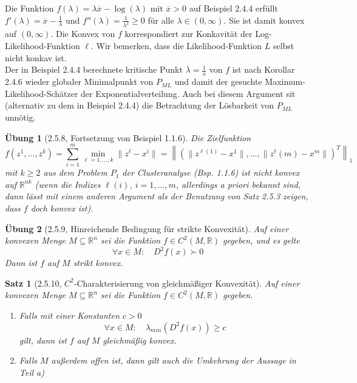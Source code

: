 \documentclass[12pt]{extreport} %
\newcommand{\R}{\mathbb{R}}
\theoremstyle{named}
\theoremstyle{nnamed}
\theoremstyle{itshape}
\newtheorem*{satz}{Satz}
\theoremstyle{normal}
\newtheorem*{uebung}{Übung}
\begin{document}
\begin{beispiel}
	Die Funktion $f(\lambda) = \lambda \overline{x} - \log(\lambda)$ mit $\overline{x} > 0$ auf Beispiel 2.4.4 erfüllt $f'(\lambda) = \overline{x} - \frac{1}{\lambda}$ und $f''(\lambda) = \frac{1}{\lambda^2} \geq 0$ für alle $\lambda \in (0, \infty)$. Sie ist damit konvex auf $(0, \infty)$. Die Konvex von $f$ korrespondiert zur Konkavität der Log-Likelihood-Funktion $\ell$. Wir bemerken, dass die Likelihood-Funktion $L$ selbst nicht konkav ist. ~\\
	
	Der in Beispiel 2.4.4 berechnete kritische Punkt $\overline{\lambda} = \frac{1}{\overline{x}}$ von $f$ ist nach Korollar 2.4.6 wieder globaler Minimalpunkt von $P_{ML}$ und damit der gesuchte Maximum-Likelihood-Schätzer der Exponentialverteilung. Auch bei diesem Argument sit (alternativ zu dem in Beispiel 2.4.4) die Betrachtung der Lösbarkeit von $P_{ML}$ unnötig.
\end{beispiel}

\begin{uebung}[2.5.8, Fortsetzung von Beispiel 1.1.6]
	Die Zielfunktion 
	$$ f(z^1, \dotsc, z^k) = \sum_{i=1}^{m} \min_{\ell=1, \dotsc, k} \| z^\ell - x^i \| = \left\| \left( \| z^{\ell(1)} - x^1 \|, \dotsc, \| z^\ell(m) - x^m \| \right)^T \right\|_1 $$	
	mit $k \geq 2$ aus dem Problem $P_1$ der Clusteranalyse (Bsp. 1.1.6) ist nicht konvex auf $\R^{nk}$ (wenn die Indizes $\ell(i)$, $i =1, \dotsc, m$, allerdings a priori bekannt sind, dann lässt mit einem anderen Argument als der Benutzung von Satz 2.5.3 zeigen, dass $f$ doch konvex ist).
\end{uebung}

\begin{uebung}[2.5.9, Hinreichende Bedingung für strikte Konvexität]
	Auf einer konvexen Menge $M \subseteq \R^n$ sei die Funktion $f \in C^2(M, \R)$ gegeben, und es gelte
	$$ \forall x\in M: \quad D^2 f(x) \succ 0 $$
	Dann ist $f$ auf $M$ strikt konvex.	
\end{uebung}

\begin{satz}[2.5.10, $C^2$-Charakterisierung von gleichmäßiger Konvexität]
	Auf einer konvexen Menge $M \subseteq \R^n$ sei die Funktion $f \in C^2(M, \R)$ gegeben.
	\begin{enumerate}
		\item Falls mit einer Konstanten $c > 0$
		$$ \forall x \in M: \quad \lambda_{min} \left( D^2 f(x) \right) \geq c $$
		gilt, dann ist $f$ auf $M$ gleichmäßig konvex.
		\item Falls $M$ außerdem offen ist, dann gilt auch die Umkehrung der Aussage in Teil a)
	\end{enumerate}	
\end{satz}
\end{document}
